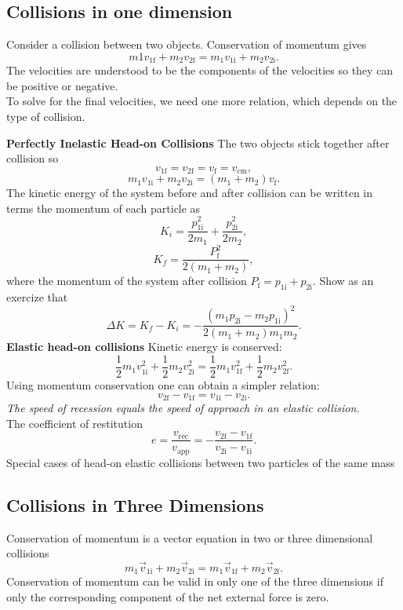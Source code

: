 \documentclass[11pt,letter]{report}
\begin{document}
\subsection{Collisions in one dimension}
Consider a collision between two objects. Conservation of momentum gives $$m1 v_{1\mathrm{f}} + m_2 v_{2\mathrm{f}} = m_1 v_{1\mathrm{i}} + m_2 v_{2\mathrm{i}}.$$
The velocities are understood to be the components of the velocities so they can be positive or negative.
\\To solve for the final velocities, we need one more relation, which depends on the type of collision.

\medskip

\noindent
\textbf{Perfectly Inelastic Head-on Collisions} The two objects stick together after collision so $$v_{1\mathrm{f}} = v_{2\mathrm{f}} = v_\mathrm{f} = v_\mathrm{cm},$$ $$m_1 v_{1\mathrm{i}} + m_2 v_{2\mathrm{i}} = \left(m_1 + m_2\right) v_\mathrm{f}.$$
The kinetic energy of the system before and after collision can be written in terms the momentum of each particle as $$K_i = \frac{p_{1\mathrm{i}}^2}{2m_1} + \frac{p_{2\mathrm{i}}^2}{2m_2},$$ $$K_f = \frac{P_\mathrm{f}^2}{2\left(m_1 + m_2\right)},$$ where the momentum of the system after collision $P_\mathrm{f} = p_{1\mathrm{i}} + p_{2\mathrm{i}}$. Show as an exercize that $$\Delta{K} = K_f - K_i = -\frac{\left(m_1 p_{2\mathrm{i}} - m_2 p_{1\mathrm{i}}\right)^2}{2\left(m_1 + m_2\right) m_1 m_2}.$$
\textbf{Elastic head-on collisions} Kinetic energy is conserved: $$\frac{1}{2} m_1 v_{1\mathrm{i}}^2 + \frac{1}{2} m_2 v_{2\mathrm{i}}^2 = \frac{1}{2} m_1 v_{1\mathrm{f}}^2 + \frac{1}{2} m_2 v_{2\mathrm{f}}^2.$$
Using momentum conservation one can obtain a simpler relation: $$v_{2\mathrm{f}} - v_{1\mathrm{f}} = v_{1\mathrm{i}} - v_{2\mathrm{i}}.$$
\textit{The speed of recession equals the speed of approach in an elastic collision.}
\\The coefficient of restitution $$e = \frac{v_\mathrm{rec}}{v_\mathrm{app}} = -\frac{v_{2\mathrm{f}} - v_{1\mathrm{f}}}{v_{2\mathrm{i}} - v_{1\mathrm{i}}}.$$
Special cases of head-on elastic collisions between two particles of the same mass

\subsection{Collisions in Three Dimensions}
Conservation of momentum is a vector equation in two or three dimensional collisions $$m_1 \vec{v}_{1\mathrm{i}} + m_2 \vec{v}_{2\mathrm{i}} = m_1 \vec{v}_{1\mathrm{f}} + m_2 \vec{v}_{2\mathrm{f}}.$$
Conservation of momentum can be valid in only one of the three dimensions if only the corresponding component of the net external force is zero.
\end{document}
